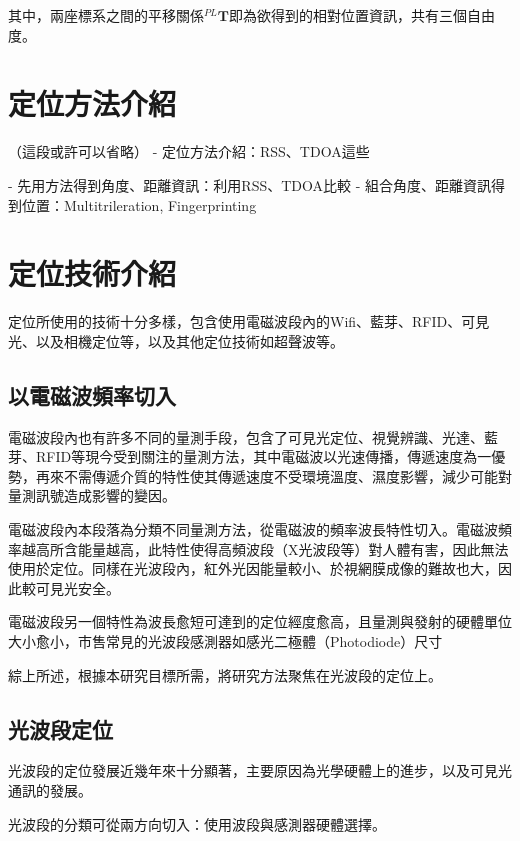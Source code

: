    其中，兩座標系之間的平移關係$^{PL}\boldsymbol{T}$即為欲得到的相對位置資訊，共有三個自由度。

 



\section{定位方法介紹}
（這段或許可以省略）
    - 定位方法介紹：RSS、TDOA這些
    
    
    - 先用方法得到角度、距離資訊：利用RSS、TDOA比較
    - 組合角度、距離資訊得到位置：Multitrileration, Fingerprinting

\section{定位技術介紹}

    定位所使用的技術十分多樣，包含使用電磁波段內的Wifi、藍芽、RFID、可見光、以及相機定位等，以及其他定位技術如超聲波等。

    \subsection{以電磁波頻率切入}

        電磁波段內也有許多不同的量測手段，包含了可見光定位、視覺辨識、光達、藍芽、RFID等現今受到關注的量測方法，其中電磁波以光速傳播，傳遞速度為一優勢，再來不需傳遞介質的特性使其傳遞速度不受環境溫度、濕度影響，減少可能對量測訊號造成影響的變因。

        電磁波段內本段落為分類不同量測方法，從電磁波的頻率波長特性切入。電磁波頻率越高所含能量越高，此特性使得高頻波段（X光波段等）對人體有害，因此無法使用於定位。同樣在光波段內，紅外光因能量較小、於視網膜成像的難故也大，因此較可見光安全。
        
        電磁波段另一個特性為波長愈短可達到的定位經度愈高，且量測與發射的硬體單位大小愈小，市售常見的光波段感測器如感光二極體（Photodiode）尺寸
        
        綜上所述，根據本研究目標所需，將研究方法聚焦在光波段的定位上。

    \subsection{光波段定位}

        光波段的定位發展近幾年來十分顯著，主要原因為光學硬體上的進步，以及可見光通訊的發展。

        光波段的分類可從兩方向切入：使用波段與感測器硬體選擇。

